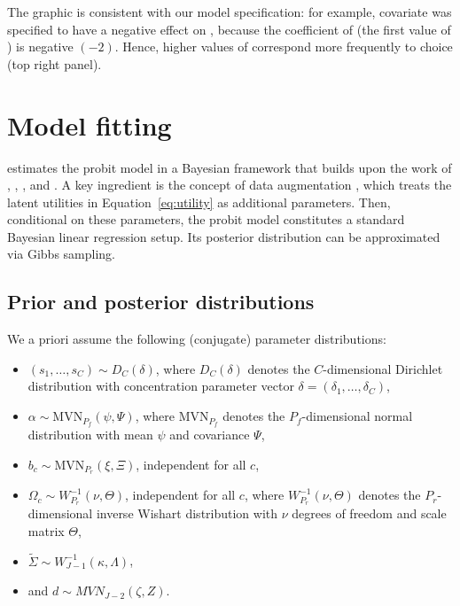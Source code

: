 \documentclass[article,shortnames]{jss}
\begin{document}
The graphic is consistent with our model specification: for example, covariate  was specified to have a negative effect on , because the coefficient of  (the first value of ) is negative $(-2)$. Hence, higher values of  correspond more frequently to choice  (top right panel).

\section{Model fitting} \label{sec:model_fitting}

 estimates the probit model in a Bayesian framework that builds upon the work of \cite{McCulloch:1994}, \cite{Nobile:1998}, \cite{Allenby:1998}, and \cite{Imai:2005}. A key ingredient is the concept of data augmentation \citep{Albert:1993}, which treats the latent utilities in Equation~\ref{eq:utility} as additional parameters. Then, conditional on these parameters, the probit model constitutes a standard Bayesian linear regression setup. Its posterior distribution can be approximated via Gibbs sampling.

\subsection{Prior and posterior distributions} \label{subsec:prior_and_posterior}

We a priori assume the following (conjugate) parameter distributions:
\begin{itemize}
  \item $(s_1,\dots,s_C)\sim D_C(\delta)$, where $D_C(\delta)$ denotes the $C$-dimensional Dirichlet distribution with concentration parameter vector $\delta = (\delta_1,\dots,\delta_C)$,
  \item $\alpha\sim \text{MVN}_{P_f}(\psi,\Psi)$, where $\text{MVN}_{P_f}$ denotes the $P_f$-dimensional normal distribution with mean $\psi$ and covariance $\Psi$,
  \item $b_c \sim \text{MVN}_{P_r}(\xi,\Xi)$, independent for all $c$,
  \item $\Omega_c \sim W^{-1}_{P_r}(\nu,\Theta)$, independent for all $c$, where $W^{-1}_{P_r}(\nu,\Theta)$ denotes the $P_r$-dimensional inverse Wishart distribution with $\nu$ degrees of freedom and scale matrix $\Theta$,
  \item $\tilde{\Sigma} \sim W^{-1}_{J-1}(\kappa,\Lambda)$,
  \item and $d \sim MVN_{J-2}(\zeta,Z)$.
\end{itemize}
\end{document}
